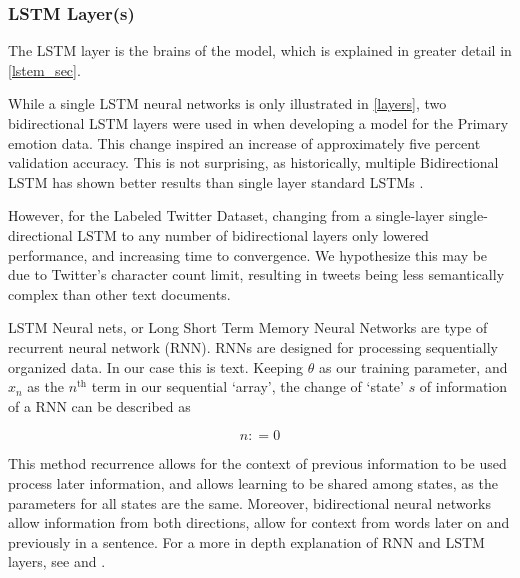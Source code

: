 \documentclass[titlepage,letterpaper]{article}
\begin{document}
 \subsubsection{LSTM Layer(s)}

The LSTM layer is the brains of the model, which is explained in greater detail in \cref{lstem_sec}.



While a single LSTM neural networks is only illustrated in \cref{layers},  two bidirectional LSTM layers were used in when developing a model for the Primary emotion data. This change inspired an increase of approximately five percent validation accuracy. This is not surprising, as historically, multiple Bidirectional LSTM has shown better results than single layer standard LSTMs \cite{Keras.io,deep_bi}. 

However, for the Labeled Twitter Dataset, changing from a single-layer single-directional LSTM to any number of bidirectional layers  only lowered performance,  and increasing time to convergence.  We hypothesize this may be due to Twitter's character count limit, resulting in tweets being less semantically complex than other text documents.

LSTM Neural nets, or Long Short Term Memory Neural Networks are type of recurrent neural network (RNN). RNNs are designed for processing sequentially organized data. In our case this is text. Keeping \(\theta\) as our training parameter, and \(x_n\) as the \( n^\text{th}\) term in our sequential `array', the change of `state' \(s\) of information of a RNN can be described as 

\begin{algorithm}[]
	\[n \mathrel{{:}{=}} 0\] 
\end{algorithm}

This method recurrence allows for the context of previous information to be used process later information, and allows learning to be shared among states, as the parameters for all states are the same. Moreover, bidirectional neural networks allow information from both directions, allow for context from words later on and previously in a sentence.
For a more in depth explanation of RNN and LSTM layers, see \textcite{NeuralNet} and \textcite{graves}.
\end{document}
